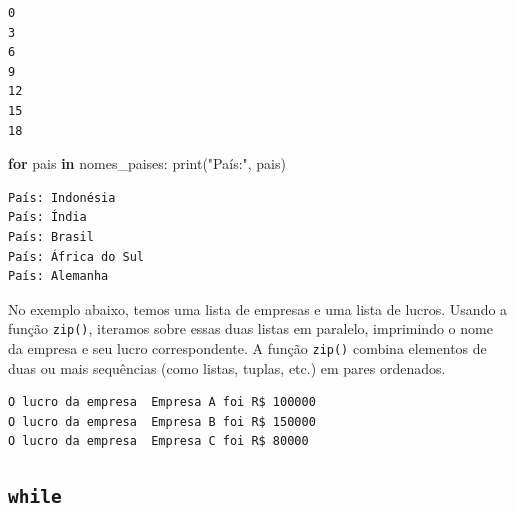 \documentclass[
  portuguese,
  letterpaper,
  DIV=11,
  numbers=noendperiod]{scrreprt}
\newenvironment{Shaded}{\begin{snugshade}}{\end{snugshade}}
\newcommand{\BuiltInTok}[1]{\textcolor[rgb]{0.00,0.23,0.31}{#1}}
\newcommand{\ControlFlowTok}[1]{\textcolor[rgb]{0.00,0.23,0.31}{\textbf{#1}}}
\newcommand{\DecValTok}[1]{\textcolor[rgb]{0.68,0.00,0.00}{#1}}
\newcommand{\KeywordTok}[1]{\textcolor[rgb]{0.00,0.23,0.31}{\textbf{#1}}}
\newcommand{\NormalTok}[1]{\textcolor[rgb]{0.00,0.23,0.31}{#1}}
\newcommand{\OperatorTok}[1]{\textcolor[rgb]{0.37,0.37,0.37}{#1}}
\newcommand{\StringTok}[1]{\textcolor[rgb]{0.13,0.47,0.30}{#1}}
\theoremstyle{definition}
\theoremstyle{remark}
\begin{document}
\begin{verbatim}
0
3
6
9
12
15
18
\end{verbatim}

\begin{Shaded}
\begin{Highlighting}[]
\ControlFlowTok{for}\NormalTok{ pais }\KeywordTok{in}\NormalTok{ nomes\_paises:}
    \BuiltInTok{print}\NormalTok{(}\StringTok{"País:"}\NormalTok{, pais)}
\end{Highlighting}
\end{Shaded}

\begin{verbatim}
País: Indonésia
País: Índia
País: Brasil
País: África do Sul
País: Alemanha
\end{verbatim}

No exemplo abaixo, temos uma lista de empresas e uma lista de lucros.
Usando a função \texttt{zip()}, iteramos sobre essas duas listas em
paralelo, imprimindo o nome da empresa e seu lucro correspondente. A
função \texttt{zip()} combina elementos de duas ou mais sequências (como
listas, tuplas, etc.) em pares ordenados.

\begin{Shaded}
\end{Shaded}

\begin{verbatim}
O lucro da empresa  Empresa A foi R$ 100000
O lucro da empresa  Empresa B foi R$ 150000
O lucro da empresa  Empresa C foi R$ 80000
\end{verbatim}

\subsection{\texorpdfstring{\texttt{while}}{while}}\label{while-1}
\end{document}
